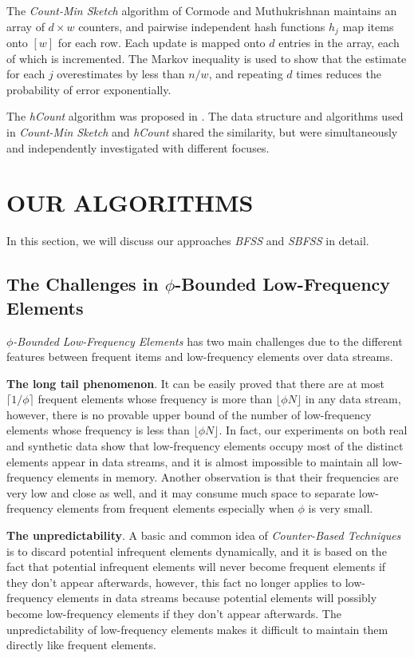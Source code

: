 \documentclass[conference]{IEEEtran}
\begin{document}
The \emph{Count-Min Sketch} algorithm of Cormode and Muthukrishnan \cite{IEEEexample:count-min} maintains an array of $d\times w$ counters, and pairwise independent hash functions $h_j$ map items onto $[w]$ for each row. Each update is mapped onto $d$ entries in the array, each of which is incremented. The Markov inequality is used to show that the estimate for each $j$ overestimates by less than $n/w$, and repeating $d$ times reduces the probability of error exponentially.\par

The \emph{hCount} algorithm was proposed in \cite{IEEEexample:hcount}. The data structure and algorithms used in \emph{Count-Min Sketch} and \emph{hCount} shared the similarity, but were simultaneously and independently investigated with different focuses.

\section{OUR ALGORITHMS}
In this section, we will discuss our approaches \emph{BFSS} and \emph{SBFSS} in detail.
\subsection{The Challenges in $\phi$-Bounded Low-Frequency Elements}
$\phi$\emph{-Bounded Low-Frequency Elements} has two main challenges due to the different features between frequent items and low-frequency elements over data streams.\par

\textbf{The long tail phenomenon}. It can be easily proved that there are at most $\lceil1/\phi\rceil$ frequent elements whose frequency is more than $\lfloor\phi N\rfloor$ in any data stream, however, there is no provable upper bound of the number of low-frequency elements whose frequency is less than $\lfloor\phi N\rfloor$. In fact, our experiments on both real and synthetic data show that low-frequency elements occupy most of the distinct elements appear in data streams, and it is almost impossible to maintain all low-frequency elements in memory. Another observation is that their frequencies are very low and close as well, and it may consume much space to separate low-frequency elements from frequent elements especially when $\phi$ is very small.\par

\textbf{The unpredictability}. A basic and common idea of \emph{Counter-Based Techniques} is to discard potential infrequent elements dynamically, and it is based on the fact that potential infrequent elements will never become frequent elements if they don't appear afterwards, however, this fact no longer applies to low-frequency elements in data streams because potential elements will possibly become low-frequency elements if they don't appear afterwards. The unpredictability of low-frequency elements makes it difficult to maintain them directly like frequent elements.
\end{document}
